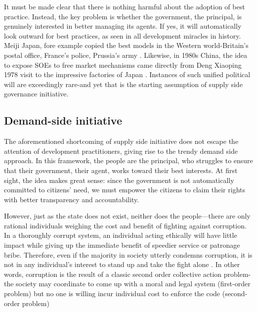 \documentclass[12pt]{article}
\begin{document}
It must be made clear that there is nothing harmful about the adoption of best practice. Instead, the key problem is whether the government, the principal, is genuinely interested in better managing its agents. If yes, it will automatically look outward for best practices, as seen in all development miracles in history. Meiji Japan, fore example copied the best models in the Western world-Britain's postal office, France's police, Prussia's army \citep{Krause2013}. Likewise, in 1980s China, the idea to expose SOEs to free market mechanisms came directly from Deng Xiaoping 1978 visit to the impressive factories of Japan \citep{Coase2012}. Instances of such unified political will are exceedingly rare-and yet that is the starting assumption of supply side governance initiative.

\subsection{Demand-side initiative}
\label{sec:demandside}

The aforementioned shortcoming of supply side initiative does not escape the attention of development practitioners, giving rise to the trendy demand side approach. In this framework, the people are the principal, who struggles to ensure that their government, their agent, works toward their best interests. At first sight, the idea makes great sense: since the government is not automatically committed to citizens' need, we must empower the citizens to claim their rights with better transparency and accountability.

However, just as the state does not exist, neither does the people---there are only rational individuals weighing the cost and benefit of fighting against corruption. In a thoroughly corrupt system, an individual acting ethically will have little impact while giving up the immediate benefit of speedier service or patronage bribe. Therefore, even if the majority in society utterly condemns corruption, it is not in any individual's interest to stand up and take the fight alone \citep{Persson2010}. In other words, corruption is the result of a classic second order collective action problem-the society may coordinate to come up with a moral and legal system (first-order problem) but no one is willing incur individual cost to enforce the code (second-order problem) \citep{Heckathorn1989}
\end{document}
